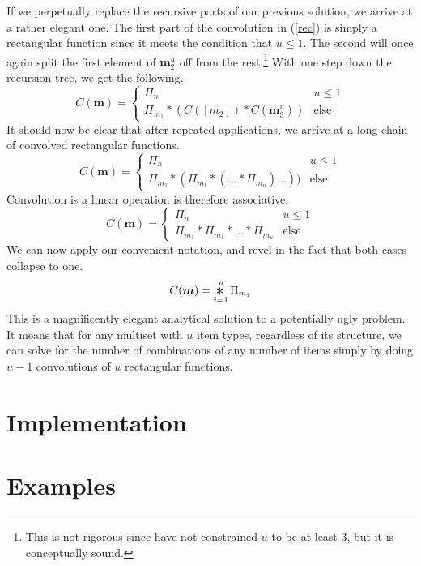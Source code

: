 \documentclass{article}
\newcommand{\Conv}{\mathop{\scalebox{1.5}{\raisebox{-0.2ex}{$\ast$}}}}%
\begin{document}
If we perpetually replace the recursive parts of our previous solution, we arrive at a rather elegant one. The first part of the convolution in (\ref{rec}) is simply a rectangular function since it meets the condition that $u\leq 1$. The second will once again split the first element of $\bm{m}_2^u$ off from the rest.\footnote{This is not rigorous since have not constrained $u$ to be at least 3, but it is conceptually sound.} With one step down the recursion tree, we get the following.
\begin{equation}
    C(\bm{m}) = \begin{cases}\Pi_n & u \leq 1 \\
    \Pi_{m_1} * (C([m_2]) * C(\bm{m}_3^u)) & \text{else} \end{cases}
\end{equation}
It should now be clear that after repeated applications, we arrive at a long chain of convolved rectangular functions.
\begin{equation}
    C(\bm{m}) = \begin{cases}\Pi_n & u \leq 1 \\
    \Pi_{m_1} * (\Pi_{m_1} * (... * \Pi_{m_u})...)) & \text{else} \end{cases}
\end{equation}
Convolution is a linear operation is therefore associative.
\begin{equation}
    C(\bm{m}) = \begin{cases}\Pi_n & u \leq 1 \\
    \Pi_{m_1} * \Pi_{m_1} * ... * \Pi_{m_u} & \text{else} \end{cases}
\end{equation}
We can now apply our convenient notation, and revel in the fact that both cases collapse to one.
\begin{equation}
    C(\bm{m}) = \Conv_{i=1}^u \Pi_{m_i}
\end{equation}
This is a magnificently elegant analytical solution to a potentially ugly problem. It means that for any multiset with $u$ item types, regardless of its structure, we can solve for the number of combinations of any number of items simply by doing $u-1$ convolutions of $u$ rectangular functions.

\section{Implementation}

\pagebreak


\section{Examples}
\end{document}
